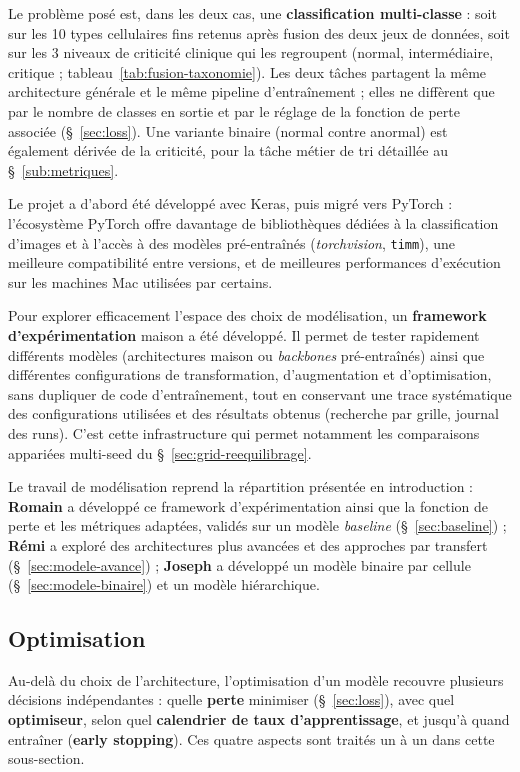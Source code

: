 Le problème posé est, dans les deux cas, une \textbf{classification multi-classe} : soit sur les 10 types cellulaires fins retenus après fusion des deux jeux de données, soit sur les 3 niveaux de criticité clinique qui les regroupent (normal, intermédiaire, critique ; tableau~\ref{tab:fusion-taxonomie}).
Les deux tâches partagent la même architecture générale et le même pipeline d'entraînement ; elles ne diffèrent que par le nombre de classes en sortie et par le réglage de la fonction de perte associée (\S~\ref{sec:loss}).
Une variante binaire (normal contre anormal) est également dérivée de la criticité, pour la tâche métier de tri détaillée au \S~\ref{sub:metriques}.

Le projet a d'abord été développé avec Keras, puis migré vers PyTorch : l'écosystème PyTorch offre davantage de bibliothèques dédiées à la classification d'images et à l'accès à des modèles pré-entraînés (\emph{torchvision}, \texttt{timm}), une meilleure compatibilité entre versions, et de meilleures performances d'exécution sur les machines Mac utilisées par certains.

Pour explorer efficacement l'espace des choix de modélisation, un \textbf{framework d'expérimentation} maison a été développé.
Il permet de tester rapidement différents modèles (architectures maison ou \emph{backbones} pré-entraînés) ainsi que différentes configurations de transformation, d'augmentation et d'optimisation, sans dupliquer de code d'entraînement, tout en conservant une trace systématique des configurations utilisées et des résultats obtenus (recherche par grille, journal des runs).
C'est cette infrastructure qui permet notamment les comparaisons appariées multi-seed du \S~\ref{sec:grid-reequilibrage}.

Le travail de modélisation reprend la répartition présentée en introduction : \textbf{Romain} a développé ce framework d'expérimentation ainsi que la fonction de perte et les métriques adaptées, validés sur un modèle \emph{baseline} (\S~\ref{sec:baseline}) ; \textbf{Rémi} a exploré des architectures plus avancées et des approches par transfert (\S~\ref{sec:modele-avance}) ; \textbf{Joseph} a développé un modèle binaire par cellule (\S~\ref{sec:modele-binaire}) et un modèle hiérarchique.

\subsection{Optimisation}

Au-delà du choix de l’architecture, l’optimisation d’un modèle recouvre plusieurs décisions indépendantes : quelle \textbf{perte} minimiser (\S~\ref{sec:loss}), avec quel \textbf{optimiseur}, selon quel \textbf{calendrier de taux d’apprentissage}, et jusqu’à quand entraîner (\textbf{early stopping}).
Ces quatre aspects sont traités un à un dans cette sous-section.

